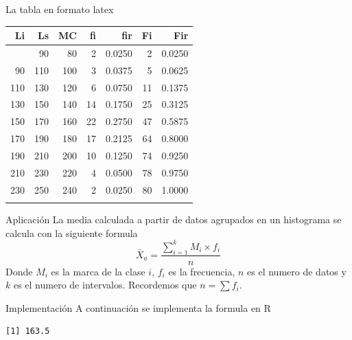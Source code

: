 \documentclass[
  ignorenonframetext,
  aspectratio=169,
  spanish,
]{beamer}
\newenvironment{Shaded}{\begin{snugshade}}{\end{snugshade}}
\newcommand{\FunctionTok}[1]{\textcolor[rgb]{0.28,0.35,0.67}{#1}}
\newcommand{\NormalTok}[1]{\textcolor[rgb]{0.00,0.23,0.31}{#1}}
\newcommand{\SpecialCharTok}[1]{\textcolor[rgb]{0.37,0.37,0.37}{#1}}
\begin{document}
\begin{frame}{La tabla en formato latex}
\label{la-tabla-en-formato-latex}
\begin{longtable}[]{@{}rrrrrrr@{}}
\toprule\noalign{}
Li & Ls & MC & fi & fir & Fi & Fir \\
\midrule\noalign{}
\endhead
70 & 90 & 80 & 2 & 0.0250 & 2 & 0.0250 \\
90 & 110 & 100 & 3 & 0.0375 & 5 & 0.0625 \\
110 & 130 & 120 & 6 & 0.0750 & 11 & 0.1375 \\
130 & 150 & 140 & 14 & 0.1750 & 25 & 0.3125 \\
150 & 170 & 160 & 22 & 0.2750 & 47 & 0.5875 \\
170 & 190 & 180 & 17 & 0.2125 & 64 & 0.8000 \\
190 & 210 & 200 & 10 & 0.1250 & 74 & 0.9250 \\
210 & 230 & 220 & 4 & 0.0500 & 78 & 0.9750 \\
230 & 250 & 240 & 2 & 0.0250 & 80 & 1.0000 \\
\bottomrule\noalign{}
\end{longtable}
\end{frame}

\begin{frame}{Aplicación}
\label{aplicaciuxf3n-1}
La media calculada a partir de datos agrupados en un histograma se
calcula con la siguiente formula
\[\bar{X}_a=\frac{\sum_{i=1}^k M_i\times f_i}{n}\] Donde \(M_i\) es la
marca de la clase \(i\), \(f_i\) es la frecuencia, \(n\) es el numero de
datos y \(k\) es el numero de intervalos. Recordemos que \(n=\sum f_i\).
\end{frame}

\begin{frame}[fragile]{Implementación}
\label{implementaciuxf3n}
A continuación se implementa la formula en R

\begin{Shaded}
\end{Shaded}

\begin{verbatim}
[1] 163.5
\end{verbatim}
\end{frame}
\end{document}
